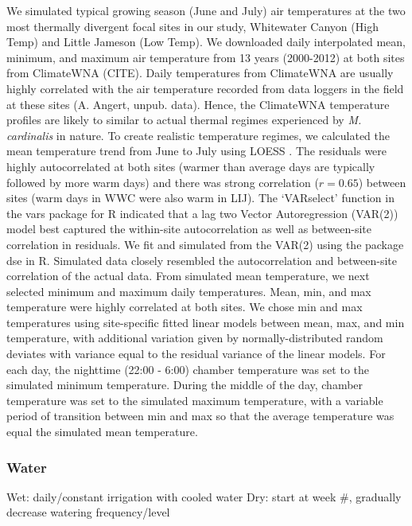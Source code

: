 \documentclass[11pt, oneside]{article}
\begin{document}
We simulated typical growing season (June and July) air temperatures at the two most thermally divergent focal sites in our study, Whitewater Canyon (High Temp) and Little Jameson (Low Temp). We downloaded daily interpolated mean, minimum, and maximum air temperature from 13 years (2000-2012) at both sites from ClimateWNA (CITE). Daily temperatures from ClimateWNA are usually highly correlated with the air temperature recorded from data loggers in the field at these sites (A. Angert, unpub. data). Hence, the ClimateWNA temperature profiles are likely to similar to actual thermal regimes experienced by \textit{M. cardinalis} in nature. To create realistic temperature regimes, we calculated the mean temperature trend from June to July using LOESS \citep{Cleveland_etal_1992}. The residuals were highly autocorrelated at both sites (warmer than average days are typically followed by more warm days) and there was strong correlation ($r = 0.65$) between sites (warm days in WWC were also warm in LIJ). The `VARselect' function in the vars package for R \citep{Pfaff_2008} indicated that a lag two Vector Autoregression (VAR(2)) model best captured the within-site autocorrelation as well as between-site correlation in residuals. We fit and simulated from the VAR(2) using the package dse \citep{Gilbert_2006?} in R. Simulated data closely resembled the autocorrelation and between-site correlation of the actual data. From simulated mean temperature, we next selected minimum and maximum daily temperatures. Mean, min, and max temperature were highly correlated at both sites. We chose min and max temperatures using site-specific fitted linear models between mean, max, and min temperature, with additional variation given by normally-distributed random deviates with variance equal to the residual variance of the linear models. For each day, the nighttime (22:00 - 6:00) chamber temperature was set to the simulated minimum temperature. During the middle of the day, chamber temperature was set to the simulated maximum temperature, with a variable period of transition between min and max so that the average temperature was equal the simulated mean temperature.

\subsubsection*{Water}

			Wet: daily/constant irrigation with cooled water
			Dry: start at week \#, gradually decrease watering frequency/level
\end{document}
